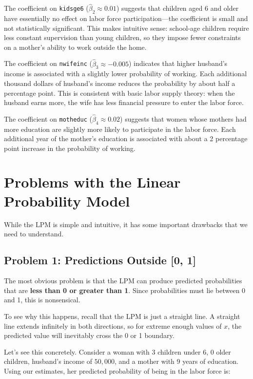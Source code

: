 \documentclass[
  letterpaper,
  DIV=11,
  numbers=noendperiod]{scrreprt}
\begin{document}
The coefficient on \texttt{kidsge6} (\(\hat{\beta}_2 \approx 0.01\))
suggests that children aged 6 and older have essentially no effect on
labor force participation---the coefficient is small and not
statistically significant. This makes intuitive sense: school-age
children require less constant supervision than young children, so they
impose fewer constraints on a mother's ability to work outside the home.

The coefficient on \texttt{nwifeinc} (\(\hat{\beta}_3 \approx -0.005\))
indicates that higher husband's income is associated with a slightly
lower probability of working. Each additional thousand dollars of
husband's income reduces the probability by about half a percentage
point. This is consistent with basic labor supply theory: when the
husband earns more, the wife has less financial pressure to enter the
labor force.

The coefficient on \texttt{motheduc} (\(\hat{\beta}_4 \approx 0.02\))
suggests that women whose mothers had more education are slightly more
likely to participate in the labor force. Each additional year of the
mother's education is associated with about a 2 percentage point
increase in the probability of working.

\section{Problems with the Linear Probability
Model}\label{problems-with-the-linear-probability-model}

While the LPM is simple and intuitive, it has some important drawbacks
that we need to understand.

\subsection{Problem 1: Predictions Outside {[}0,
1{]}}\label{problem-1-predictions-outside-0-1}

The most obvious problem is that the LPM can produce predicted
probabilities that are \textbf{less than 0 or greater than 1}. Since
probabilities must lie between 0 and 1, this is nonsensical.

To see why this happens, recall that the LPM is just a straight line. A
straight line extends infinitely in both directions, so for extreme
enough values of \(x\), the predicted value will inevitably cross the 0
or 1 boundary.

Let's see this concretely. Consider a woman with 3 children under 6, 0
older children, husband's income of \(50{,}000\), and a mother with 9
years of education. Using our estimates, her predicted probability of
being in the labor force is:
\end{document}
